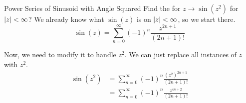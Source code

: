 \begin{example}{Power Series of Sinusoid with Angle Squared}
  Find the  for $z \to \sin(z^{2})$ for $\left\lvert z \right\rvert < \infty$?
  \tcblower{}
  We already know what $\sin(z)$ is on $\left\lvert z \right\rvert < \infty$, so we start there.
  \begin{equation*}
    \sin(z) = \sum_{n=0}^{\infty} {(-1)}^{n} \frac{z^{2n+1}}{(2n+1)!}
  \end{equation*}

  Now, we need to modify it to handle $z^{2}$.
  We can just replace all instances of $z$ with $z^{2}$.
  \begin{align*}
    \sin(z^{2}) &= \sum_{n=0}^{\infty} {(-1)}^{n} \frac{{\left( z^{2} \right)}^{2n+1}}{(2n+1)!} \\
                &= \sum_{n=0}^{\infty} {(-1)}^{n} \frac{z^{4n+2}}{(2n+1)!} \\
  \end{align*}
\end{example}

